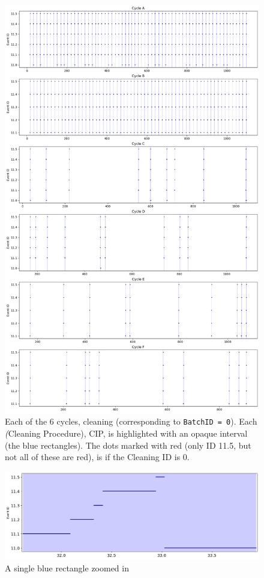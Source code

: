 \documentclass[../Thesis.tex]{subfiles}
\begin{document}
\begin{figure}[H]
    \centering
    \includegraphics[width=0.9\linewidth]{figures/Multiple cycles data/Cleaning batches.png}
    \caption{Each of the 6 cycles, cleaning (corresponding to \texttt{BatchID = 0}). Each \textit(Cleaning Procedure), CIP, is highlighted with an opaque interval (the blue rectangles). The dots marked with red (only ID 11.5, but not all of these are red), is if the Cleaning ID is 0.}
    \label{fig:cycle cleaning time series}
\end{figure}


\begin{figure}[h]
    \centering
    \includegraphics[width=0.9\linewidth]{figures/Multiple cycles data/Cleaning batches timeseries single.png}
    \caption{A single blue rectangle zoomed in}
    \label{fig:cycle cleaning time series single}
\end{figure}
\end{document}
